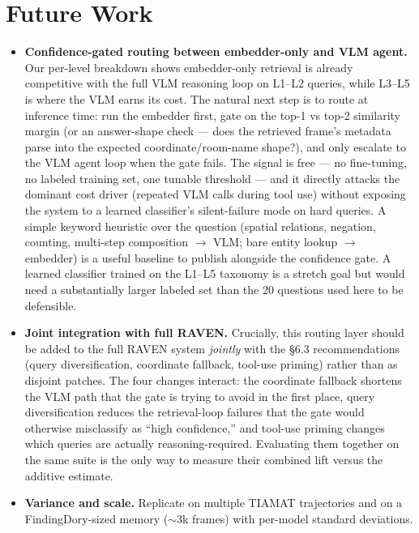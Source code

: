 \documentclass[11pt]{article}
\begin{document}
\section{Future Work}

\begin{itemize}[leftmargin=*,itemsep=2pt]
  \item \textbf{Confidence-gated routing between embedder-only and VLM agent.} Our per-level breakdown shows embedder-only retrieval is already competitive with the full VLM reasoning loop on L1--L2 queries, while L3--L5 is where the VLM earns its cost. The natural next step is to route at inference time: run the embedder first, gate on the top-1 vs top-2 similarity margin (or an answer-shape check --- does the retrieved frame's metadata parse into the expected coordinate/room-name shape?), and only escalate to the VLM agent loop when the gate fails. The signal is free --- no fine-tuning, no labeled training set, one tunable threshold --- and it directly attacks the dominant cost driver (repeated VLM calls during tool use) without exposing the system to a learned classifier's silent-failure mode on hard queries. A simple keyword heuristic over the question (spatial relations, negation, counting, multi-step composition $\to$ VLM; bare entity lookup $\to$ embedder) is a useful baseline to publish alongside the confidence gate. A learned classifier trained on the L1--L5 taxonomy is a stretch goal but would need a substantially larger labeled set than the 20 questions used here to be defensible.
  \item \textbf{Joint integration with full RAVEN.} Crucially, this routing layer should be added to the full RAVEN system \emph{jointly} with the \S6.3 recommendations (query diversification, coordinate fallback, tool-use priming) rather than as disjoint patches. The four changes interact: the coordinate fallback shortens the VLM path that the gate is trying to avoid in the first place, query diversification reduces the retrieval-loop failures that the gate would otherwise misclassify as ``high confidence,'' and tool-use priming changes which queries are actually reasoning-required. Evaluating them together on the same suite is the only way to measure their combined lift versus the additive estimate.
  \item \textbf{Variance and scale.} Replicate on multiple TIAMAT trajectories and on a FindingDory-sized memory ($\sim$3k frames) with per-model standard deviations.
\end{itemize}
\end{document}
